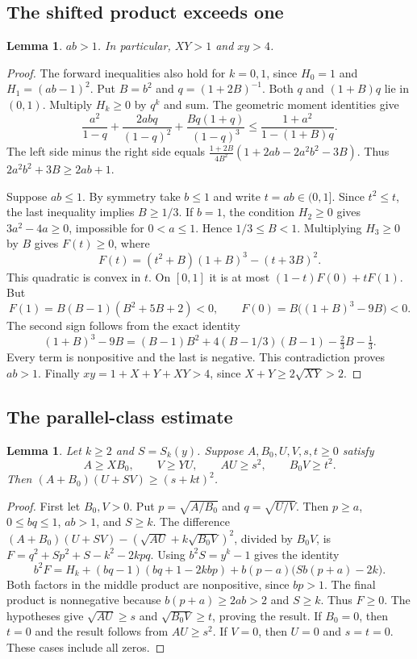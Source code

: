 \documentclass[11pt,a4paper]{article}
\newtheorem{lemma}[theorem]{Lemma}
\begin{document}
\subsection{The shifted product exceeds one}
\begin{lemma}\label{lem:product}
$ab>1$. In particular, $XY>1$ and $xy>4$.
\end{lemma}
\begin{proof}
The forward inequalities also hold for $k=0,1$, since
$H_0=1$ and $H_1=(ab-1)^2$. Put $B=b^2$ and $q=(1+2B)^{-1}$.
Both $q$ and $(1+B)q$ lie in $(0,1)$. Multiply $H_k\geq0$ by $q^k$
and sum. The geometric moment identities give
\[
\frac{a^2}{1-q}+\frac{2abq}{(1-q)^2}
+\frac{Bq(1+q)}{(1-q)^3}\leq\frac{1+a^2}{1-(1+B)q}.
\]
The left side minus the right side equals
$\frac{1+2B}{4B^2}(1+2ab-2a^2b^2-3B)$.
Thus $2a^2b^2+3B\geq2ab+1$.

Suppose $ab\leq1$. By symmetry take $b\leq1$ and write $t=ab\in(0,1]$.
Since $t^2\leq t$, the last inequality implies $B\geq1/3$.
If $b=1$, the condition $H_2\geq0$ gives $3a^2-4a\geq0$, impossible
for $0<a\leq1$. Hence $1/3\leq B<1$.
Multiplying $H_3\geq0$ by $B$ gives $F(t)\geq0$, where
\[
F(t)=(t^2+B)(1+B)^3-(t+3B)^2.
\]
This quadratic is convex in $t$. On $[0,1]$ it is at most
$(1-t)F(0)+tF(1)$. But
\[
F(1)=B(B-1)(B^2+5B+2)<0,\qquad F(0)=B\bigl((1+B)^3-9B\bigr)<0.
\]
The second sign follows from the exact identity
\[
(1+B)^3-9B=(B-1)B^2+4(B-1/3)(B-1)-\tfrac23B-\tfrac13.
\]
Every term is nonpositive and the last is negative. This contradiction
proves $ab>1$. Finally $xy=1+X+Y+XY>4$, since $X+Y\geq2\sqrt{XY}>2$.
\end{proof}

\subsection{The parallel-class estimate}
\begin{lemma}\label{lem:parallel-scalar}
Let $k\geq2$ and $S=S_k(y)$. Suppose $A,B_0,U,V,s,t\geq0$ satisfy
\[
A\geq XB_0,\qquad V\geq YU,\qquad AU\geq s^2,\qquad B_0V\geq t^2.
\]
Then $(A+B_0)(U+SV)\geq(s+kt)^2$.
\end{lemma}
\begin{proof}
First let $B_0,V>0$. Put $p=\sqrt{A/B_0}$ and $q=\sqrt{U/V}$.
Then $p\geq a$, $0\leq bq\leq1$, $ab>1$, and $S\geq k$.
The difference
$(A+B_0)(U+SV)-(\sqrt{AU}+k\sqrt{B_0V})^2$, divided by $B_0V$, is
$F=q^2+Sp^2+S-k^2-2kpq$. Using $b^2S=y^k-1$ gives the identity
\begin{equation}\label{eq:scalar-identity}
b^2F=H_k+(bq-1)(bq+1-2kbp)+b(p-a)\bigl(Sb(p+a)-2k\bigr).
\end{equation}
Both factors in the middle product are nonpositive, since $bp>1$.
The final product is nonnegative because $b(p+a)\geq2ab>2$ and
$S\geq k$. Thus $F\geq0$. The hypotheses give $\sqrt{AU}\geq s$
and $\sqrt{B_0V}\geq t$, proving the result.
If $B_0=0$, then $t=0$ and the result follows from $AU\geq s^2$.
If $V=0$, then $U=0$ and $s=t=0$. These cases include all zeros.
\end{proof}
\end{document}
